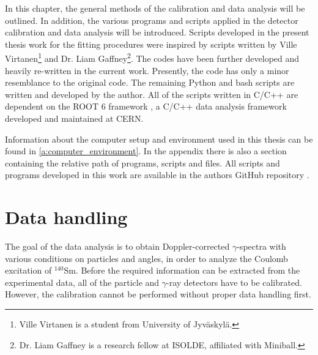 \documentclass[twoside,english]{uiofysmaster/uiofysmaster}
\newcommand{\Sm}{$^{140}$Sm} %
\newcommand{\ga}{$\gamma$}
\let\orgautoref\autoref
\renewcommand{\autoref}
        {%
		 \def\sectionautorefname{Section}%
		 \def\subsectionautorefname{Section}%
		 \def\subsubsectionautorefname{Section}%
		 \def\chapterautorefname{Chapter}%
          \orgautoref}
\begin{document}
In this chapter, the general methods of the calibration and data analysis will be outlined. In addition, the various programs and scripts applied in the detector calibration and data analysis will be introduced. 
Scripts developed in the present thesis work for the fitting procedures were inspired by scripts written by Ville Virtanen\footnote{Ville Virtanen is a student from University of Jyväskylä.} and Dr. Liam Gaffney\footnote{Dr. Liam Gaffney is a research fellow at ISOLDE, affiliated with Miniball.}. 
The codes have been further developed and heavily re-written in the current work. 
Presently, the code has only a minor resemblance to the original code. 
The remaining Python and bash scripts are written and developed by the author.
All of the scripts written in C/C++ are dependent on the ROOT 6 framework \cite{ROOT}, a C/C++ data analysis framework developed and maintained at CERN.

Information about the computer setup and environment used in this thesis can be found in \autoref{a:computer_environment}. In the appendix there is also a section containing the relative path of programs, scripts and files.
All scripts and programs developed in this work are available in the authors GitHub repository \cite{GH-repo}.


\section{Data handling}
The goal of the data analysis is to obtain Doppler-corrected \ga-spectra with various conditions on particles and angles, in order to analyze the Coulomb excitation of \Sm. 
Before the required information can be extracted from the experimental data, all of the particle and \ga-ray detectors have to be calibrated.
However, the calibration cannot be performed without proper data handling first.
\end{document}
